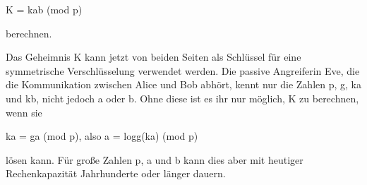 \documentclass[ngerman,a4paper,12pt]{scrreprt}
\begin{document}
K = kab (mod p)

berechnen.

\li 
Das Geheimnis K kann jetzt von beiden Seiten als Schlüssel für eine symmetrische Verschlüsselung verwendet werden. 
\li Die passive Angreiferin Eve, die die Kommunikation zwischen Alice und Bob abhört, kennt nur die Zahlen p, g, ka und kb, nicht jedoch a oder b. Ohne diese ist es ihr nur möglich, K zu berechnen, wenn sie

ka = ga (mod p), also a = logg(ka) (mod p)

lösen kann. Für große Zahlen p, a und b kann dies aber mit heutiger Rechenkapazität Jahrhunderte oder länger dauern.
\ulE





\end{document}
